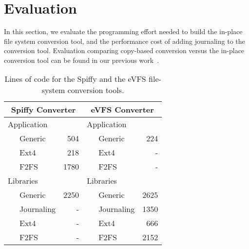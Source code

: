 \vspace{-0.7em}
\section{Evaluation\label{sec:Evaluation}}
\vspace{-0.4em}

In this section, we evaluate the programming effort needed to build the in-place file system conversion tool, and the performance cost of adding journaling to the conversion tool. Evaluation comparing copy-based conversion versus the in-place conversion tool can be found in our previous work~\cite{sun2018spiffy}.



\begin{table}
\begin{small}
\begin{center}
\begin{tabular}{|llr|llr|}
\hline 
\multicolumn{3}{|c|}{\textbf{Spiffy Converter}} & \multicolumn{3}{c|}{\textbf{eVFS Converter}}\tabularnewline
\hline 
\multicolumn{3}{|l|}{Application} & \multicolumn{3}{l|}{Application}\tabularnewline
~ & Generic & 504 & ~ & Generic & 224\tabularnewline
 & Ext4 & 218 &  & Ext4 & -\tabularnewline
 & F2FS & 1780 &  & F2FS & -\tabularnewline
\hline 
\multicolumn{3}{|l|}{Libraries} & \multicolumn{3}{l|}{Libraries}\tabularnewline
 & Generic & 2250 &  & Generic & 2625\tabularnewline
 & Journaling & - &  & Journaling & 1350\tabularnewline
 & Ext4 & - &  & Ext4 & 666\tabularnewline
 & F2FS & - &  & F2FS & 2152\tabularnewline
\hline 
\end{tabular}
\end{center}
\end{small}
\vspace{-15pt}
\caption{\label{tab:programming-effort}Lines of code for the Spiffy and the eVFS file-system conversion tools.}
\vspace{-5pt}
\end{table}

